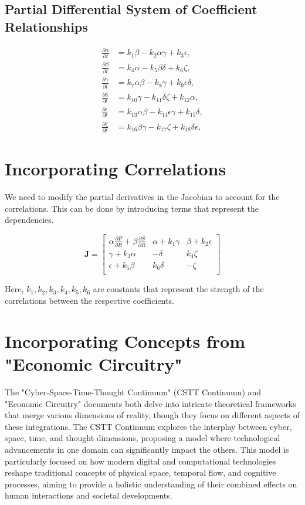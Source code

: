 \documentclass{article}
\begin{document}
\subsection{Partial Differential System of Coefficient Relationships}
\begin{align}
  \frac{\partial \alpha}{\partial t} &= k_1 \beta - k_2 \alpha \gamma + k_3 \epsilon, \\
  \frac{\partial \beta}{\partial t} &= k_4 \alpha - k_5 \beta \delta + k_6 \zeta, \\
  \frac{\partial \gamma}{\partial t} &= k_7 \alpha \beta - k_8 \gamma + k_9 \epsilon \delta, \\
  \frac{\partial \delta}{\partial t} &= k_{10} \gamma - k_{11} \delta \zeta + k_{12} \alpha, \\
  \frac{\partial \epsilon}{\partial t} &= k_{13} \alpha \beta - k_{14} \epsilon \gamma + k_{15} \delta, \\
  \frac{\partial \zeta}{\partial t} &= k_{16} \beta \gamma - k_{17} \zeta + k_{18} \delta \epsilon,
\end{align}

\section*{Incorporating Correlations}
We need to modify the partial derivatives in the Jacobian to account for the correlations. This can be done by introducing terms that represent the dependencies.

\[
\mathbf{J} = \begin{bmatrix}
\alpha \frac{\partial P}{\partial R} + \beta \frac{\partial S}{\partial R} & \alpha + k_1 \gamma & \beta + k_2 \epsilon \\
\gamma + k_3 \alpha & -\delta & k_4 \zeta \\
\epsilon + k_5 \beta & k_6 \delta & -\zeta \\
\end{bmatrix}
\]

Here, \(k_1, k_2, k_3, k_4, k_5, k_6\) are constants that represent the strength of the correlations between the respective coefficients.
\section*{Incorporating Concepts from "Economic Circuitry"}
The "Cyber-Space-Time-Thought Continuum" (CSTT Continuum) and "Economic Circuitry" documents both delve into intricate theoretical frameworks that merge various dimensions of reality, though they focus on different aspects of these integrations. The CSTT Continuum explores the interplay between cyber, space, time, and thought dimensions, proposing a model where technological advancements in one domain can significantly impact the others. This model is particularly focused on how modern digital and computational technologies reshape traditional concepts of physical space, temporal flow, and cognitive processes, aiming to provide a holistic understanding of their combined effects on human interactions and societal developments.
\end{document}
